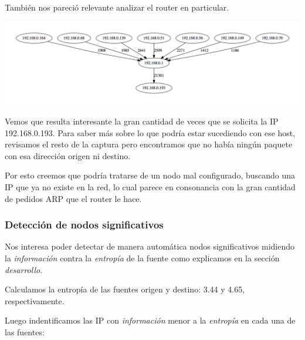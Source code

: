 También nos pareció relevante analizar el router en particular.\newline

\includegraphics[scale=0.3]{graphics/t-work-router-1000w.png}

Vemos que resulta interesante la gran cantidad de veces que se solicita la IP 192.168.0.193. Para saber más sobre lo que podría estar sucediendo con ese host, revisamos el resto de la captura pero encontramos que no había ningún paquete con esa dirección origen ni destino.\newline

Por esto creemos que podría tratarse de un nodo mal configurado, buscando una IP que ya no existe en la red, lo cual parece en consonancia con la gran cantidad de pedidos ARP que el router le hace.\newline

\subsubsection{Detección de nodos significativos}

Nos interesa poder detectar de manera automática nodos significativos midiendo la \textit{información} contra la \textit{entropía} de la fuente como explicamos en la sección \textit{desarrollo}.\newline

Calculamos la entropía de las fuentes origen y destino: 3.44 y 4.65, respectivamente.\newline

Luego indentificamos las IP con \textit{información} menor a la \textit{entropía} en cada una de las fuentes:\newline

